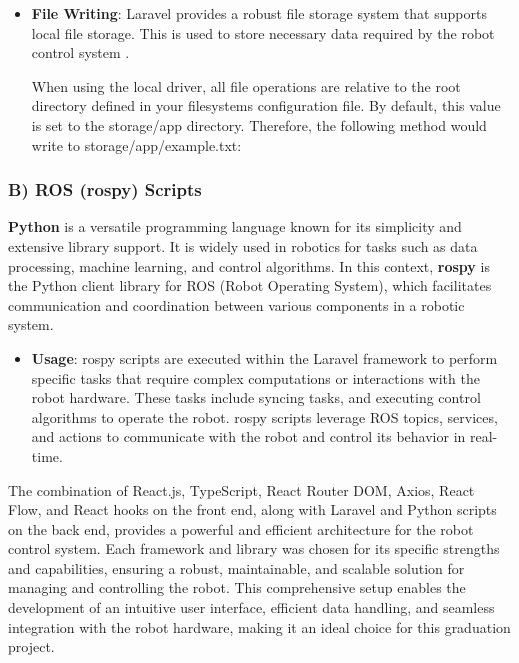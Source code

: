 \begin{itemize}
\begin{itemize}
 \vspace{-4mm}
        
        \item \textbf{File Writing}: Laravel provides a robust file storage system that supports local file storage. This is used to store necessary data required by the robot control system \cite{laravel-filesystem}. 
        
        When using the local driver, all file operations are relative to the root directory defined in your filesystems configuration file. By default, this value is set to the storage/app directory. Therefore, the following method would write to storage/app/example.txt:
        \vspace{1mm}
        
 
    \end{itemize}
\end{itemize}


\subsubsection*{B) ROS (rospy) Scripts}

\textbf{Python} is a versatile programming language known for its simplicity and extensive library support. It is widely used in robotics for tasks such as data processing, machine learning, and control algorithms. In this context, \textbf{rospy} is the Python client library for ROS (Robot Operating System), which facilitates communication and coordination between various components in a robotic system.

\begin{itemize}
\item \textbf{Usage}: rospy scripts are executed within the Laravel framework to perform specific tasks that require complex computations or interactions with the robot hardware. These tasks include syncing tasks, and executing control algorithms to operate the robot. rospy scripts leverage ROS topics, services, and actions to communicate with the robot and control its behavior in real-time.
\end{itemize}


The combination of React.js, TypeScript, React Router DOM, Axios, React Flow, and React hooks on the front end, along with Laravel and Python scripts on the back end, provides a powerful and efficient architecture for the robot control system. Each framework and library was chosen for its specific strengths and capabilities, ensuring a robust, maintainable, and scalable solution for managing and controlling the robot. This comprehensive setup enables the development of an intuitive user interface, efficient data handling, and seamless integration with the robot hardware, making it an ideal choice for this graduation project.


